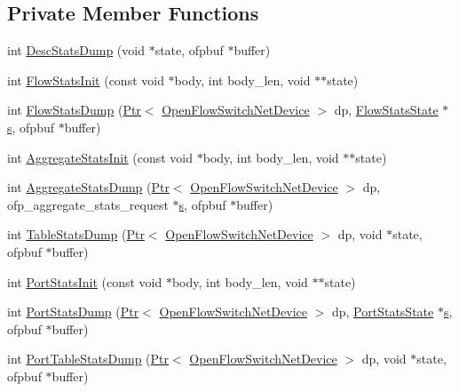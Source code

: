 \subsection*{Private Member Functions}
\begin{DoxyCompactItemize}
\item 
int \hyperlink{classns3_1_1ofi_1_1Stats_aed481a8eed33282429ee7759d5cca481}{Desc\+Stats\+Dump} (void $\ast$state, ofpbuf $\ast$buffer)
\item 
int \hyperlink{classns3_1_1ofi_1_1Stats_ae252d358351797c1726170894e3c8bc7}{Flow\+Stats\+Init} (const void $\ast$body, int body\+\_\+len, void $\ast$$\ast$state)
\item 
int \hyperlink{classns3_1_1ofi_1_1Stats_a5d2b220186ce4887706c5a8367d23855}{Flow\+Stats\+Dump} (\hyperlink{classns3_1_1Ptr}{Ptr}$<$ \hyperlink{classns3_1_1OpenFlowSwitchNetDevice}{Open\+Flow\+Switch\+Net\+Device} $>$ dp, \hyperlink{structns3_1_1ofi_1_1Stats_1_1FlowStatsState}{Flow\+Stats\+State} $\ast$\hyperlink{generate__test__data__lte__sinr_8m_ad83eeb3a142285d1243a08c6b7026df8}{s}, ofpbuf $\ast$buffer)
\item 
int \hyperlink{classns3_1_1ofi_1_1Stats_a537b2f15513cf20aa27f25cc3326b298}{Aggregate\+Stats\+Init} (const void $\ast$body, int body\+\_\+len, void $\ast$$\ast$state)
\item 
int \hyperlink{classns3_1_1ofi_1_1Stats_a8e1b305c87e2b1524efb64999c5e1dd9}{Aggregate\+Stats\+Dump} (\hyperlink{classns3_1_1Ptr}{Ptr}$<$ \hyperlink{classns3_1_1OpenFlowSwitchNetDevice}{Open\+Flow\+Switch\+Net\+Device} $>$ dp, ofp\+\_\+aggregate\+\_\+stats\+\_\+request $\ast$\hyperlink{generate__test__data__lte__sinr_8m_ad83eeb3a142285d1243a08c6b7026df8}{s}, ofpbuf $\ast$buffer)
\item 
int \hyperlink{classns3_1_1ofi_1_1Stats_aaeaaba20f0f86e8b58de0b5cd600f3f3}{Table\+Stats\+Dump} (\hyperlink{classns3_1_1Ptr}{Ptr}$<$ \hyperlink{classns3_1_1OpenFlowSwitchNetDevice}{Open\+Flow\+Switch\+Net\+Device} $>$ dp, void $\ast$state, ofpbuf $\ast$buffer)
\item 
int \hyperlink{classns3_1_1ofi_1_1Stats_a021b39df475793aab61c794b5c152c9e}{Port\+Stats\+Init} (const void $\ast$body, int body\+\_\+len, void $\ast$$\ast$state)
\item 
int \hyperlink{classns3_1_1ofi_1_1Stats_ae819eb43042a7d47ec29ac5200513f45}{Port\+Stats\+Dump} (\hyperlink{classns3_1_1Ptr}{Ptr}$<$ \hyperlink{classns3_1_1OpenFlowSwitchNetDevice}{Open\+Flow\+Switch\+Net\+Device} $>$ dp, \hyperlink{structns3_1_1ofi_1_1Stats_1_1PortStatsState}{Port\+Stats\+State} $\ast$\hyperlink{generate__test__data__lte__sinr_8m_ad83eeb3a142285d1243a08c6b7026df8}{s}, ofpbuf $\ast$buffer)
\item 
int \hyperlink{classns3_1_1ofi_1_1Stats_a11e2b65efe3f25cd00a3b911e6d8384f}{Port\+Table\+Stats\+Dump} (\hyperlink{classns3_1_1Ptr}{Ptr}$<$ \hyperlink{classns3_1_1OpenFlowSwitchNetDevice}{Open\+Flow\+Switch\+Net\+Device} $>$ dp, void $\ast$state, ofpbuf $\ast$buffer)
\end{DoxyCompactItemize}
